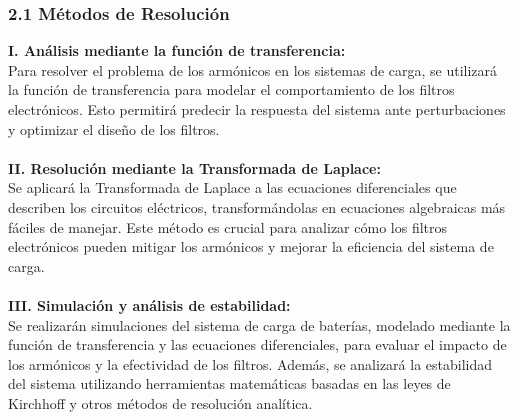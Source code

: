 \subsubsection{2.1 M\'etodos de Resoluci\'on}
\textbf{I. An\'alisis mediante la funci\'on de transferencia:}\\
Para resolver el problema de los arm\'onicos en los sistemas de carga, se utilizar\'a la funci\'on de transferencia para modelar el comportamiento de los filtros electr\'onicos. Esto permitir\'a predecir la respuesta del sistema ante perturbaciones y optimizar el dise\~no de los filtros.
\\\\[1ex]
\textbf{II. Resoluci\'on mediante la Transformada de Laplace:}\\
Se aplicar\'a la Transformada de Laplace a las ecuaciones diferenciales que describen los circuitos el\'ectricos, transform\'andolas en ecuaciones algebraicas m\'as f\'aciles de manejar. Este m\'etodo es crucial para analizar c\'omo los filtros electr\'onicos pueden mitigar los arm\'onicos y mejorar la eficiencia del sistema de carga.
\\\\[1ex]
\textbf{III. Simulaci\'on y an\'alisis de estabilidad:}\\
Se realizar\'an simulaciones del sistema de carga de bater\'ias, modelado mediante la funci\'on de transferencia y las ecuaciones diferenciales, para evaluar el impacto de los arm\'onicos y la efectividad de los filtros. Adem\'as, se analizar\'a la estabilidad del sistema utilizando herramientas matem\'aticas basadas en las leyes de Kirchhoff y otros m\'etodos de resoluci\'on anal\'itica.
\newpage
